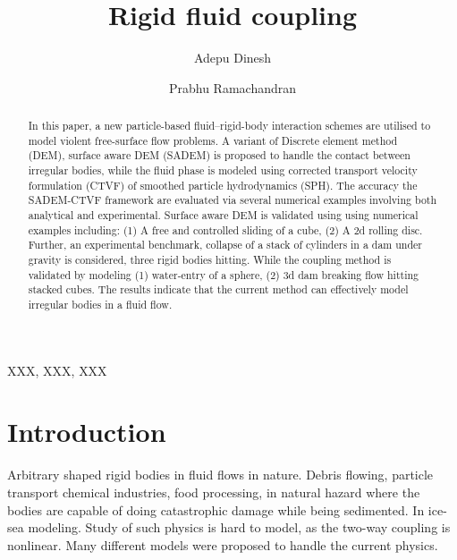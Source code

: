 \documentclass[preprint,12pt]{elsarticle}
\begin{document}
\begin{frontmatter}

  \title{Rigid fluid coupling}
  \author[IITB]{Adepu Dinesh }
   \author[IITB]{Prabhu Ramachandran}
   \address[IITB]{Department of Aerospace
    Engineering, Indian Institute of Technology Bombay, Powai, Mumbai 400076}


\begin{abstract}
  In this paper, a new particle-based fluid–rigid-body interaction schemes are
  utilised to model violent free-surface flow problems. A variant of Discrete
  element method (DEM), surface aware DEM (SADEM) is proposed to handle the
  contact between irregular bodies, while the fluid phase is modeled using
  corrected transport velocity formulation (CTVF) of smoothed particle
  hydrodynamics (SPH). The accuracy the SADEM-CTVF framework are evaluated via
  several numerical examples involving both analytical and experimental.
  Surface aware DEM is validated using using numerical examples including: (1)
  A free and controlled sliding of a cube, (2) A 2d rolling disc. Further, an
  experimental benchmark, collapse of a stack of cylinders in a dam under
  gravity is considered, three rigid bodies hitting. While the coupling method
  is validated by modeling (1) water-entry of a sphere, (2) 3d dam breaking
  flow hitting stacked cubes. The results indicate that the current method can
  effectively model irregular bodies in a fluid flow.
\end{abstract}

\begin{keyword}
{XXX}, {XXX}, {XXX}


\end{keyword}

\end{frontmatter}


\section{Introduction}
\label{sec:intro}

Arbitrary shaped rigid bodies in fluid flows in nature. Debris flowing,
particle transport chemical industries, food processing, in natural hazard
where the bodies are capable of doing catastrophic damage while being
sedimented. In ice-sea modeling. Study of such physics is hard to model, as
the two-way coupling is nonlinear. Many different models were proposed to
handle the current physics.
\end{document}
